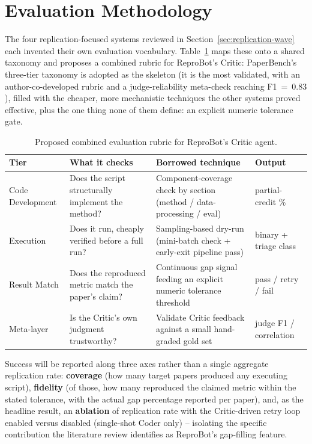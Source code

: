 \documentclass[11pt]{article}
\begin{document}
\section{Evaluation Methodology}
\label{sec:evaluation}

The four replication-focused systems reviewed in Section~\ref{sec:replication-wave}
each invented their own evaluation vocabulary. Table~\ref{tab:rubric} maps these onto a
shared taxonomy and proposes a combined rubric for ReproBot's Critic: PaperBench's
three-tier taxonomy is adopted as the skeleton (it is the most validated, with an
author-co-developed rubric and a judge-reliability meta-check reaching F1~=~0.83
\cite{starace2025paperbench}), filled with the cheaper, more mechanistic techniques the
other systems proved effective, plus the one thing none of them define: an explicit
numeric tolerance gate.

\begin{table}[h]
\centering
\small
\begin{tabular}{@{}p{2.4cm}p{3.6cm}p{5.6cm}p{2.2cm}@{}}
\toprule
\textbf{Tier} & \textbf{What it checks} & \textbf{Borrowed technique} & \textbf{Output} \\
\midrule
Code Development & Does the script structurally implement the method? & Component-coverage check by section (method / data-processing / eval) &
partial-credit \% \\
Execution & Does it run, cheaply verified before a full run? & Sampling-based dry-run (mini-batch check + early-exit pipeline pass) &
binary + triage class \\
Result Match & Does the reproduced metric match the paper's claim? & Continuous gap signal feeding an explicit numeric tolerance threshold &
pass / retry / fail \\
Meta-layer & Is the Critic's own judgment trustworthy? & Validate Critic feedback against a small hand-graded gold set &
judge F1 / correlation \\
\bottomrule
\end{tabular}
\caption{Proposed combined evaluation rubric for ReproBot's Critic agent.}
\label{tab:rubric}
\end{table}

Success will be reported along three axes rather than a single aggregate replication
rate: \textbf{coverage} (how many target papers produced any executing script),
\textbf{fidelity} (of those, how many reproduced the claimed metric within the stated
tolerance, with the actual gap percentage reported per paper), and, as the headline
result, an \textbf{ablation} of replication rate with the Critic-driven retry loop
enabled versus disabled (single-shot Coder only) -- isolating the specific contribution
the literature review identifies as ReproBot's gap-filling feature.
\end{document}
